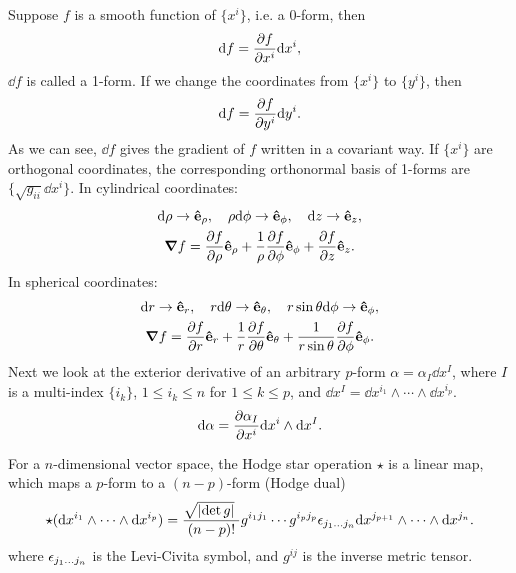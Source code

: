 \documentclass[10pt]{article}
\begin{document}
	Suppose $f$ is a smooth function of $\{ x^i \}$, i.e. a 0-form, then
	\begin{equation}
		\dd f = \pdv{f}{x^i} \dd x^i,
	\end{equation}
	$\dd f$ is called a 1-form. If we change the coordinates from $\{ x^i \}$ to $\{ y^i \}$, then
	\begin{equation}
		\dd f = \pdv{f}{y^i} \dd y^i.
	\end{equation}
	As we can see, $\dd f$ gives the gradient of $f$ written in a covariant way. If $\{ x^i \}$ are orthogonal coordinates, the corresponding orthonormal basis of 1-forms are $\{\sqrt{g_{ii}} \dd x^i \}$.
	In cylindrical coordinates:
	\begin{gather}
		\dd \rho \to \vu{e}_{\rho}, \quad \rho \dd \phi \to \vu{e}_{\phi}, \quad \dd z \to \vu{e}_{z}, \\
		\grad{f} = \pdv{f}{\rho} \vu{e}_{\rho} + \frac{1}{\rho}\pdv{f}{\phi} \vu{e}_{\phi} + \pdv{f}{z} \vu{e}_z.
	\end{gather}
	In spherical coordinates:
	\begin{gather}
		\dd r \to \vu{e}_r, \quad r \dd \theta \to \vu{e}_{\theta}, \quad r \sin \theta \dd \phi \to \vu{e}_{\phi}, \\
		\grad{f} = \pdv{f}{r} \vu{e}_r + \frac{1}{r}\pdv{f}{\theta} \vu{e}_{\theta} + \frac{1}{r \sin \theta} \pdv{f}{\phi} \vu{e}_{\phi}.
	\end{gather}
	Next we look at the exterior derivative of an arbitrary $p$-form $\alpha = \alpha_I \dd x^I$, where $I$ is a multi-index $\{ i_k \}$, $1 \le i_k \le n$ for $1 \le k \le p$, and $\dd x^I = \dd x^{i_1} \wedge \cdots \wedge \dd x^{i_p}$.
	\begin{equation}
		\dd \alpha = \pdv{\alpha_I}{x^i} \dd x^i \wedge \dd x^I.
	\end{equation}

	\begin{definition}
		For a $n$-dimensional vector space, the Hodge star operation $\star$ is a linear map, which maps a $p$-form to a $(n-p)$-form (Hodge dual)
		\begin{equation}
			\star (\dd x^{i_1} \wedge \cdots \wedge \dd x^{i_p}) = \frac{\sqrt{\abs{\det g}}~}{(n-p)!} g^{i_1 j_1} \cdots g^{i_p j_p} \epsilon_{j_1 \dots j_n} \dd x^{j_{p+1}} \wedge \cdots \wedge \dd x^{j_n}.
		\end{equation}
		where $\epsilon_{j_1 \dots j_n}$ is the Levi-Civita symbol, and $g^{ij}$ is the inverse metric tensor.
	\end{definition}
\end{document}
